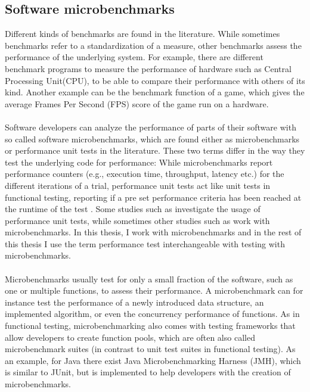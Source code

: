 \documentclass{seal_thesis}
\begin{document}
\subsection{Software microbenchmarks}

Different kinds of benchmarks are found in the literature. While sometimes benchmarks refer to a standardization of a measure, other benchmarks assess the performance of the underlying system. For example, there are different benchmark programs to measure the performance of hardware such as Central Processing Unit(CPU), to be able to compare their performance with others of its kind. Another example can be the benchmark function of a game, which gives the average Frames Per Second (FPS) score of the game run on a hardware.\\
\\
Software developers can analyze the performance of parts of their software with so called software microbenchmarks, which are found either as microbenchmarks or performance unit tests in the literature\cite{costa2019}. These two terms differ in the way they test the underlying code for performance: While microbenchmarks report performance counters (e.g., execution time, throughput, latency etc.) for the different iterations of a trial, performance unit tests act like unit tests in functional testing, reporting if a pre set performance criteria has been reached at the runtime of the test \cite{costa2019}. Some studies such as \cite{Stefan:2017:UTP:3030207.3030226}\cite{Horky:2015:UPU:2668930.2688051} investigate the usage of performance unit tests, while sometimes other studies such as \cite{Laaber:2018:EOS:3196398.3196407}\cite{rodriguez2016automatic} work with microbenchmarks. In this thesis, I work with microbenchmarks and in the rest of this thesis I use the term performance test interchangeable with testing with microbenchmarks.\\
\\
Microbenchmarks usually test for only a small fraction of the software, such as one or multiple functions, to assess their performance. A microbenchmark can for instance test the performance of a newly introduced data structure, an implemented algorithm, or even the concurrency performance of functions\cite{costa2019}. As in functional testing, microbenchmarking also comes with testing frameworks that allow developers to create function pools, which are often also called microbenchmark suites (in contrast to unit test suites in functional testing). As an example, for Java there exist Java Microbenchmarking Harness (JMH), which is similar to JUnit, but is implemented to help developers with the creation of microbenchmarks\cite{JMH}.\\
\end{document}
